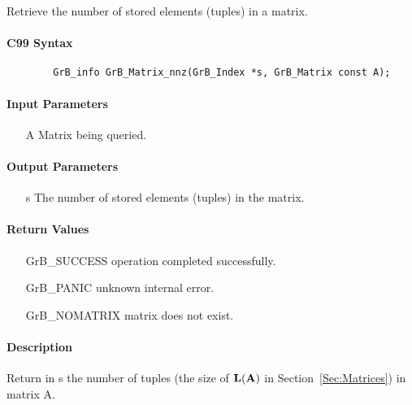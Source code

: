 Retrieve the number of stored elements (tuples) in a matrix.

\paragraph{C99 Syntax}

\begin{verbatim}
        GrB_info GrB_Matrix_nnz(GrB_Index *s, GrB_Matrix const A);
\end{verbatim}

\paragraph{Input Parameters}

\begin{itemize}[leftmargin=1.1in]
    \item[{\sf A}] Matrix being queried.
\end{itemize}

\paragraph{Output Parameters}
\begin{itemize}[leftmargin=1.1in]
    \item[{\sf s}] The number of stored elements (tuples) in the matrix.
\end{itemize}

\paragraph{Return Values}

\begin{itemize}[leftmargin=2.1in]
\item[{\sf GrB\_SUCCESS}]   operation completed successfully.
\item[{\sf GrB\_PANIC}]     unknown internal error.
\item[{\sf GrB\_NOMATRIX}]  matrix does not exist.
\end{itemize}

\paragraph{Description}

Return in {\sf s} the number of tuples (the size of $\bold{L}({\bf A})$
in Section~\ref{Sec:Matrices}) in matrix {\sf A}.
